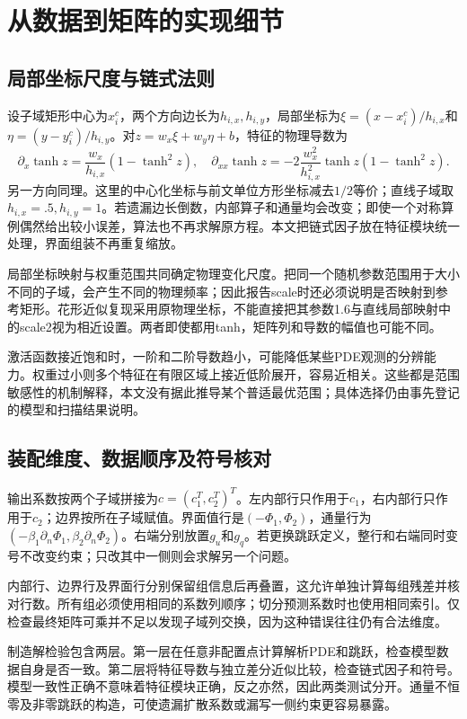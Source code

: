 \section{从数据到矩阵的实现细节}
\subsection{局部坐标尺度与链式法则}
设子域矩形中心为$x_i^c$，两个方向边长为$h_{i,x},h_{i,y}$，局部坐标为$\xi=(x-x_i^c)/h_{i,x}$和$\eta=(y-y_i^c)/h_{i,y}$。对$z=w_x\xi+w_y\eta+b$，特征的物理导数为
\[
\partial_x\tanh z=\frac{w_x}{h_{i,x}}(1-\tanh^2z),\quad
\partial_{xx}\tanh z=-2\frac{w_x^2}{h_{i,x}^2}\tanh z(1-\tanh^2z).
\]
另一方向同理。这里的中心化坐标与前文单位方形坐标减去$1/2$等价；直线子域取$h_{i,x}=.5,h_{i,y}=1$。若遗漏边长倒数，内部算子和通量均会改变；即使一个对称算例偶然给出较小误差，算法也不再求解原方程。本文把链式因子放在特征模块统一处理，界面组装不再重复缩放。

局部坐标映射与权重范围共同确定物理变化尺度。把同一个随机参数范围用于大小不同的子域，会产生不同的物理频率；因此报告scale时还必须说明是否映射到参考矩形。花形近似复现采用原物理坐标，不能直接把其参数1.6与直线局部映射中的scale2视为相近设置。两者即使都用tanh，矩阵列和导数的幅值也可能不同。

激活函数接近饱和时，一阶和二阶导数趋小，可能降低某些PDE观测的分辨能力。权重过小则多个特征在有限区域上接近低阶展开，容易近相关。这些都是范围敏感性的机制解释，本文没有据此推导某个普适最优范围；具体选择仍由事先登记的模型和扫描结果说明。

\subsection{装配维度、数据顺序及符号核对}
输出系数按两个子域拼接为$c=(c_1^T,c_2^T)^T$。左内部行只作用于$c_1$，右内部行只作用于$c_2$；边界按所在子域赋值。界面值行是$(-\Phi_1,\Phi_2)$，通量行为$(-\beta_1\partial_n\Phi_1,\beta_2\partial_n\Phi_2)$。右端分别放置$g_u$和$g_q$。若更换跳跃定义，整行和右端同时变号不改变约束；只改其中一侧则会求解另一个问题。

内部行、边界行及界面行分别保留组信息后再叠置，这允许单独计算每组残差并核对行数。所有组必须使用相同的系数列顺序；切分预测系数时也使用相同索引。仅检查最终矩阵可乘并不足以发现子域列交换，因为这种错误往往仍有合法维度。

制造解检验包含两层。第一层在任意非配置点计算解析PDE和跳跃，检查模型数据自身是否一致。第二层将特征导数与独立差分近似比较，检查链式因子和符号。模型一致性正确不意味着特征模块正确，反之亦然，因此两类测试分开。通量不恒零及非零跳跃的构造，可使遗漏扩散系数或漏写一侧约束更容易暴露。

